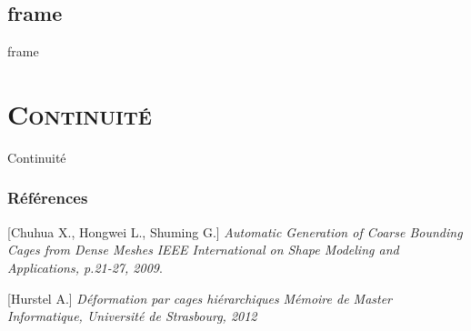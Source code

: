 \documentclass[xcolor=x11names,compress]{beamer}
\renewcommand{\(}{\begin{columns}} \renewcommand{\)}{\end{columns}}
\newcommand{\<}[1]{\begin{column}{#1}} \renewcommand{\>}{\end{column}}
\begin{document}
\subsection{frame}
\begin{frame}{frame}

\end{frame}

\section{\scshape Continuité}
\begin{frame}{Continuité}

\end{frame}

\begin{frame}
  \frametitle{Références} \footnotesize{
    \begin{thebibliography}{99} %

    [Chuhua X., Hongwei L., Shuming G.]
      \newblock \textit{Automatic Generation of Coarse Bounding Cages
        from Dense Meshes} \newblock \textit{IEEE International on
        Shape Modeling and Applications, p.21-27, 2009}.

    [Hurstel A.]  \newblock
      \textit{Déformation par cages hiérarchiques} \newblock
      \textit{Mémoire de Master Informatique, Université de
        Strasbourg, 2012}

\end{thebibliography}
}
\end{frame}
\end{document}
